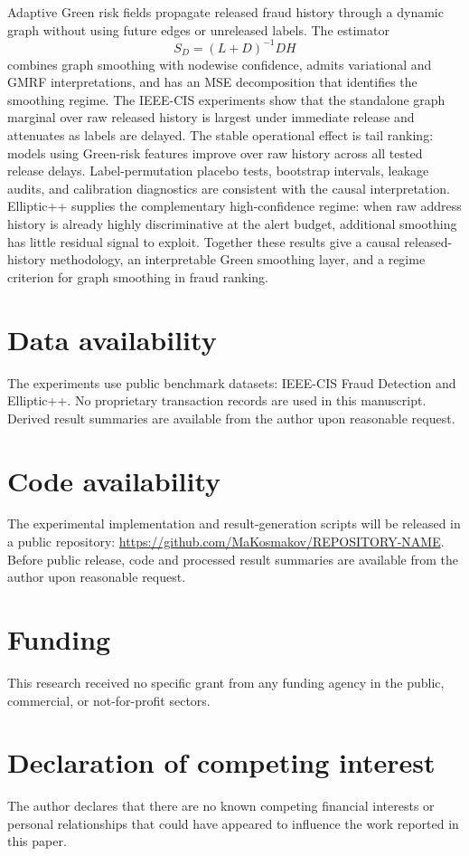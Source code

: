 \documentclass[11pt]{article}
\theoremstyle{definition}
\theoremstyle{remark}
\begin{document}
Adaptive Green risk fields propagate released fraud history through a dynamic graph without using future edges or unreleased labels. The estimator
\[
        S_D=(L+D)^{-1}DH
\]
combines graph smoothing with nodewise confidence, admits variational and GMRF interpretations, and has an MSE decomposition that identifies the smoothing regime. The IEEE-CIS experiments show that the standalone graph marginal over raw released history is largest under immediate release and attenuates as labels are delayed. The stable operational effect is tail ranking: models using Green-risk features improve over raw history across all tested release delays. Label-permutation placebo tests, bootstrap intervals, leakage audits, and calibration diagnostics are consistent with the causal interpretation. Elliptic++ supplies the complementary high-confidence regime: when raw address history is already highly discriminative at the alert budget, additional smoothing has little residual signal to exploit. Together these results give a causal released-history methodology, an interpretable Green smoothing layer, and a regime criterion for graph smoothing in fraud ranking.


\section*{Data availability}
The experiments use public benchmark datasets: IEEE-CIS Fraud Detection and Elliptic++. No proprietary transaction records are used in this manuscript. Derived result summaries are available from the author upon reasonable request.

\section*{Code availability}
The experimental implementation and result-generation scripts will be released in a public repository: \url{https://github.com/MaKosmakov/REPOSITORY-NAME}. Before public release, code and processed result summaries are available from the author upon reasonable request.

\section*{Funding}
This research received no specific grant from any funding agency in the public, commercial, or not-for-profit sectors.

\section*{Declaration of competing interest}
The author declares that there are no known competing financial interests or personal relationships that could have appeared to influence the work reported in this paper.
\end{document}
